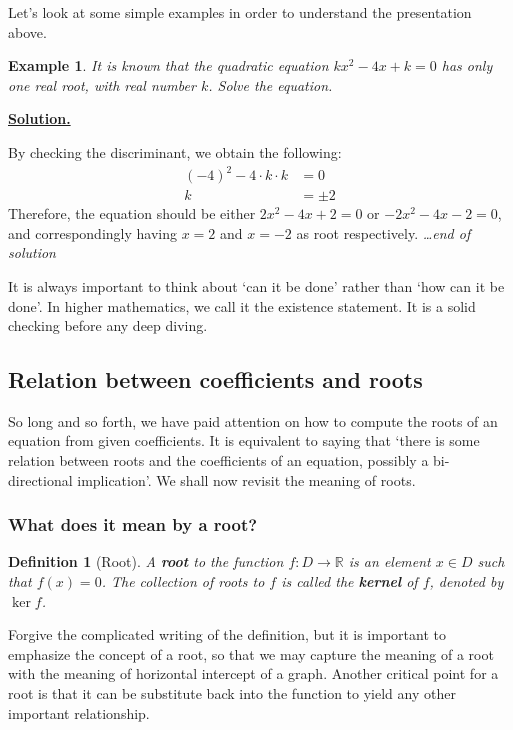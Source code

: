 \documentclass[12pt]{article}
\newtheorem{definition}{Definition}[section]
\newtheorem*{example}{Example}
\newenvironment{solution}{\begin{snugshade*} \underline{\textbf{Solution.}} \par}{\hfill \textit{\dots end of solution} \end{snugshade*}}
\begin{document}
    Let's look at some simple examples in order to understand the presentation above.

    \begin{example}
        It is known that the quadratic equation $kx^2-4x+k=0$ has only one real root, with real number $k$. Solve the equation.
    \end{example}

    \begin{solution}
        By checking the discriminant, we obtain the following:\begin{align*}
            (-4)^2-4\cdot k\cdot k&=0\\
            k&=\pm 2
        \end{align*}
        Therefore, the equation should be either $2x^2-4x+2=0$ or $-2x^2-4x-2=0$, and correspondingly having $x=2$ and $x=-2$ as root respectively.
    \end{solution}

    It is always important to think about `can it be done' rather than `how can it be done'. In higher mathematics, we call it the existence statement. It is a solid checking before any deep diving.

    \subsection{Relation between coefficients and roots}

    So long and so forth, we have paid attention on how to compute the roots of an equation from given coefficients. It is equivalent to saying that `there is some relation between roots and the coefficients of an equation, possibly a bi-directional implication'. We shall now revisit the meaning of roots.

    \subsubsection*{What does it mean by a root?}

    \begin{definition}[Root]
        A \textbf{root} to the function $f:D\to \mathbb{R}$ is an element $x\in D$ such that $f(x)=0$. The collection of roots to $f$ is called the \textbf{kernel} of $f$, denoted by $\ker{f}$.
    \end{definition}

    Forgive the complicated writing of the definition, but it is important to emphasize the concept of a root, so that we may capture the meaning of a root with the meaning of horizontal intercept of a graph. Another critical point for a root is that it can be substitute back into the function to yield any other important relationship.
\end{document}
